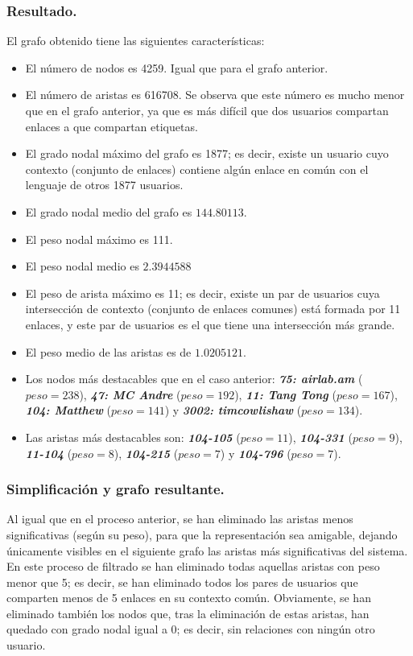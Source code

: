 \subsubsection{Resultado.}

El grafo obtenido tiene las siguientes características:
\begin{itemize}
\item    El número de nodos es 4259. Igual que para el grafo anterior.
\item    El número de aristas es 616708. Se observa que este número es mucho menor que en el grafo anterior, ya que es más difícil que dos usuarios compartan enlaces a que compartan etiquetas.
\item    El grado nodal máximo del grafo es 1877; es decir, existe un usuario cuyo contexto (conjunto de enlaces) contiene algún enlace en común con el lenguaje de otros 1877 usuarios.
\item    El grado nodal medio del grafo es $144.80113$.
\item    El peso nodal máximo es 111.
\item    El peso nodal medio es $2.3944588$
\item    El peso de arista máximo es 11; es decir, existe un par de usuarios cuya intersección de contexto (conjunto de enlaces comunes) está formada por 11 enlaces, y este par de usuarios es el que tiene una intersección más grande.
\item    El peso medio de las aristas es de $1.0205121$.
\item Los nodos más destacables que en el caso anterior: \emph{{\bf 75: airlab.am}} ($peso=238$), \emph{{\bf 47: MC Andre}} ($peso=192$), \emph{{\bf 11: Tang Tong}} ($peso=167$), \emph{{\bf 104: Matthew}} ($peso=141$) y \emph{{\bf 3002: timcowlishaw}} ($peso=134$).
\item Las aristas más destacables son: \emph{{\bf 104-105}} ($peso=11$), \emph{{\bf 104-331}} ($peso=9$), \emph{{\bf 11-104}} ($peso=8$), \emph{{\bf 104-215}} ($peso=7$) y \emph{{\bf 104-796}} ($peso=7$).
\end{itemize}

\subsubsection{Simplificación y grafo resultante.}

Al igual que en el proceso anterior, se han eliminado las aristas menos significativas (según su peso), para que la representación sea amigable, dejando únicamente visibles en el siguiente grafo las aristas más significativas del sistema. En este proceso de filtrado se han eliminado todas aquellas aristas con peso menor que 5; es decir, se han eliminado todos los pares de usuarios que comparten menos de 5 enlaces en su contexto común. Obviamente, se han eliminado también los nodos que, tras la eliminación de estas aristas, han quedado con grado nodal igual a 0; es decir, sin relaciones con ningún otro usuario.

